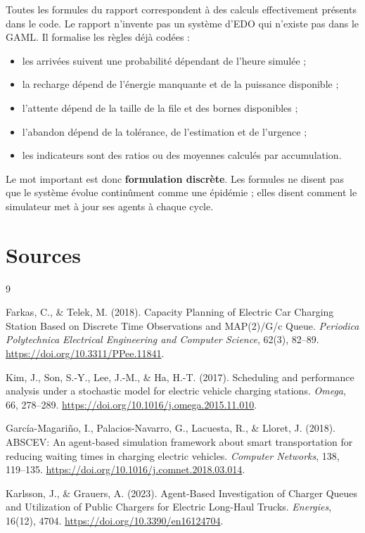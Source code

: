 \documentclass[11pt]{article}
\begin{document}
Toutes les formules du rapport correspondent à des calculs effectivement présents dans le code. Le rapport n'invente pas un système d'EDO qui n'existe pas dans le GAML. Il formalise les règles déjà codées :
\begin{itemize}
  \item les arrivées suivent une probabilité dépendant de l'heure simulée ;
  \item la recharge dépend de l'énergie manquante et de la puissance disponible ;
  \item l'attente dépend de la taille de la file et des bornes disponibles ;
  \item l'abandon dépend de la tolérance, de l'estimation et de l'urgence ;
  \item les indicateurs sont des ratios ou des moyennes calculés par accumulation.
\end{itemize}

Le mot important est donc \textbf{formulation discrète}. Les formules ne disent pas que le système évolue continûment comme une épidémie ; elles disent comment le simulateur met à jour ses agents à chaque cycle.

\section{Sources}

\begin{thebibliography}{9}

Farkas, C., \& Telek, M. (2018).
Capacity Planning of Electric Car Charging Station Based on Discrete Time Observations and MAP(2)/G/c Queue.
\emph{Periodica Polytechnica Electrical Engineering and Computer Science}, 62(3), 82--89.
\url{https://doi.org/10.3311/PPee.11841}.

Kim, J., Son, S.-Y., Lee, J.-M., \& Ha, H.-T. (2017).
Scheduling and performance analysis under a stochastic model for electric vehicle charging stations.
\emph{Omega}, 66, 278--289.
\url{https://doi.org/10.1016/j.omega.2015.11.010}.

García-Magariño, I., Palacios-Navarro, G., Lacuesta, R., \& Lloret, J. (2018).
ABSCEV: An agent-based simulation framework about smart transportation for reducing waiting times in charging electric vehicles.
\emph{Computer Networks}, 138, 119--135.
\url{https://doi.org/10.1016/j.comnet.2018.03.014}.

Karlsson, J., \& Grauers, A. (2023).
Agent-Based Investigation of Charger Queues and Utilization of Public Chargers for Electric Long-Haul Trucks.
\emph{Energies}, 16(12), 4704.
\url{https://doi.org/10.3390/en16124704}.

\end{thebibliography}
\end{document}
